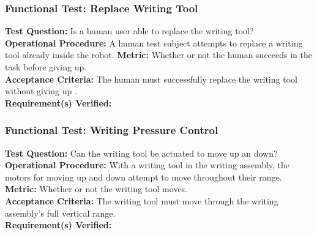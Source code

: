 \subsubsection{Functional Test: Replace Writing Tool}
\label{test:writing_ft_replace}
\textbf{Test Question:} Is a human user able to replace the writing tool? \\
\textbf{Operational Procedure:} A human test subject attempts to replace a writing tool already inside the robot.
\textbf{Metric:} Whether or not the human succeeds in the task before giving up.\\
\textbf{Acceptance Criteria:} The human must successfully replace the writing tool without giving up .  \\
\textbf{Requirement(s) Verified:}   \\


\subsubsection{Functional Test: Writing Pressure Control}
\label{test:writing_ft_pressure}
\textbf{Test Question:} Can the writing tool be actuated to move up an down?\\
\textbf{Operational Procedure:} With a writing tool in the writing assembly, the motors for moving up and down attempt to move throughout their range. \\
\textbf{Metric:} Whether or not the writing tool moves. \\
\textbf{Acceptance Criteria:} The writing tool must move through the writing assembly's full vertical range. \\
\textbf{Requirement(s) Verified:} 

